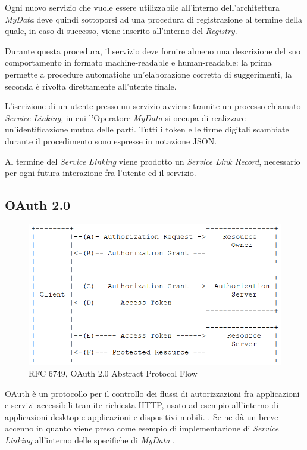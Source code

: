Ogni nuovo servizio che vuole essere utilizzabile all’interno dell’architettura \textit{MyData} deve quindi sottoporsi ad una procedura di registrazione al termine della quale, in caso di successo, viene inserito all’interno del \textit{Registry}.

Durante questa procedura, il servizio deve fornire almeno una descrizione del suo comportamento in formato machine-readable e human-readable: la prima permette a procedure automatiche un'elaborazione corretta di suggerimenti, la seconda \`e rivolta direttamente all’utente finale.

L’iscrizione di un utente presso un servizio avviene tramite un processo chiamato \textit{Service Linking}, in cui l’Operatore \textit{MyData} si occupa di realizzare un'identificazione mutua delle parti. Tutti i token e le firme digitali scambiate durante il procedimento sono espresse in notazione JSON.

Al termine del \textit{Service Linking} viene prodotto un \textit{Service Link Record}, necessario per ogni futura interazione fra l’utente ed il servizio.

\subsection{OAuth 2.0}
\label{subsec:OAuth20}
\begin{figure} [h]
	\centering
	\includegraphics[width=0.6\linewidth]{pictures/OAuthAbstractProtocolFlow.png}
	\caption{RFC 6749, OAuth 2.0 Abstract Protocol Flow}
	\label{fig:OAuthAbstractProtocolFlow}
\end{figure}
OAuth \`e un protocollo per il controllo dei flussi di autorizzazioni fra applicazioni e servizi accessibili tramite richiesta HTTP, usato ad esempio all'interno di  applicazioni desktop e applicazioni e dispositivi mobili. \cite{oauth}. Se ne d\`a un breve accenno in quanto viene preso come esempio di implementazione di \textit{Service Linking} all’interno delle specifiche di \textit{MyData} \cite{githubmydatastack}.

